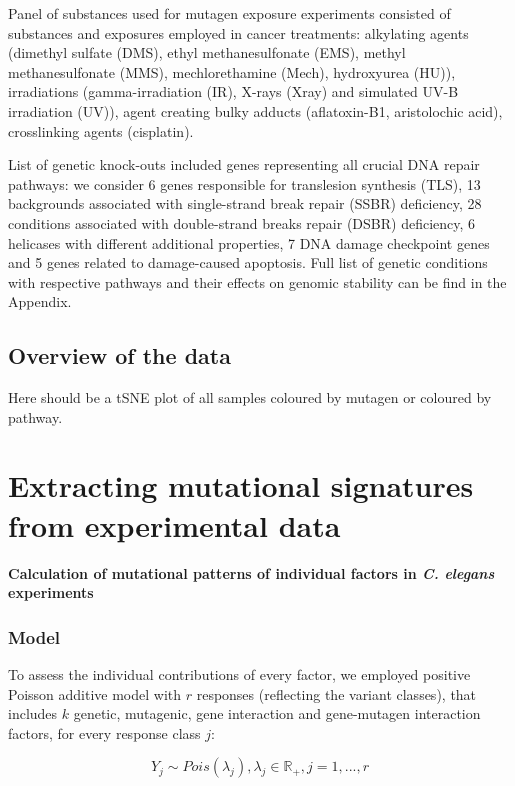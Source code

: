 Panel of substances used for mutagen exposure experiments consisted of substances and 
exposures employed in cancer treatments: 
alkylating agents (dimethyl sulfate (DMS), ethyl methanesulfonate (EMS), methyl 
methanesulfonate (MMS), mechlorethamine (Mech), hydroxyurea (HU)), irradiations 
(gamma-irradiation (IR), X-rays (Xray) and simulated UV-B irradiation (UV)), 
agent creating bulky adducts (aflatoxin-B1, aristolochic acid), crosslinking agents 
(cisplatin).

List of genetic knock-outs included genes representing all crucial DNA repair pathways: 
we consider 6 genes responsible for translesion synthesis (TLS), 13 backgrounds associated 
with single-strand break repair (SSBR) deficiency, 28 conditions associated with double-strand 
breaks repair (DSBR) deficiency, 6 helicases with different additional properties, 7 DNA damage 
checkpoint genes and 5 genes related to damage-caused apoptosis. Full list of genetic conditions with respective pathways and their effects on  genomic stability can be find in the Appendix.

\subsection{Overview of the data}

Here should be a tSNE plot of all samples coloured by mutagen or coloured by pathway.


\section{Extracting mutational signatures from experimental data}

\textbf{Calculation of mutational patterns of individual factors in \textit{C. elegans} experiments}


\subsubsection*{Model}

To assess the individual contributions of every factor, we employed positive Poisson additive 
model with $r$ responses (reflecting the variant classes), that includes $k$ genetic, 
mutagenic, gene interaction and gene-mutagen interaction factors, for every response 
class $j$:

\[Y_{j} \sim Pois(\lambda_{j}), \lambda_{j} \in  \mathbb{R}_{+} , j = 1, ..., r\]

